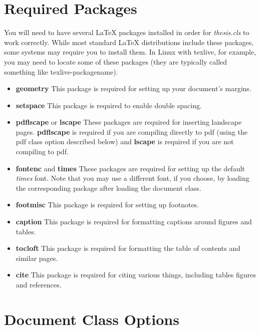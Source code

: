 \documentclass[master]{thesis}
\begin{document}
\section{Required Packages}

You will need to have several \LaTeX{} packages installed in order for \textit{thesis.cls} to work correctly.  While most standard \LaTeX{} distributions include these packages, some systems may require you to install them.  In Linux with texlive, for example, you may need to locate some of these packages (they are typically called something like texlive-packagename).

\begin{itemize}
    \item \textbf{geometry}  This package is required for setting up your document's margins.

    \item \textbf{setspace}  This package is required to enable double spacing.

    \item \textbf{pdflscape}  or \textbf{lscape}  These packages are required for inserting landscape pages.  \textbf{pdflscape} is required if you are compiling directly to pdf (using the pdf class option described below) and \textbf{lscape} is required if you are not compiling to pdf.

    \item \textbf{fontenc} and \textbf{times}  These packages are required for setting up the default \textit{times} font.  Note that you may use a different font, if you choose, by loading the corresponding package after loading the document class.

    \item \textbf{footmisc}  This package is required for setting up footnotes.

    \item \textbf{caption}  This package is required for formatting captions around figures and tables.

    \item \textbf{tocloft}  This package is required for formatting the table of contents and similar pages.

    \item \textbf{cite}  This package is required for citing various things, including tables figures and references.
\end{itemize}

\section{Document Class Options}
\end{document}
